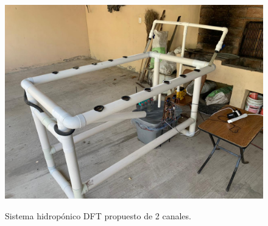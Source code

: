 \begin{figure}[H]
\centering
         \includegraphics[scale=0.27]{imgs/dosCanales.jpg} \\
    \caption{Sistema hidropónico DFT propuesto de 2 canales. }\label{sistema8_2}
\end{figure}



